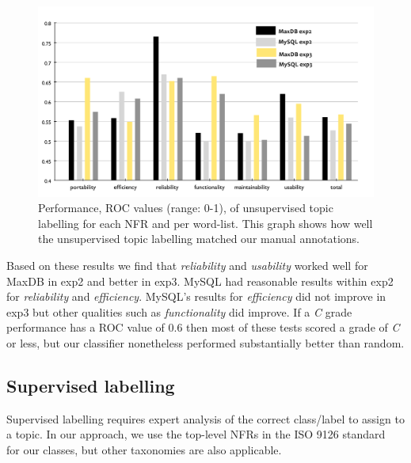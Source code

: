 \documentclass[]{sig-alternate}
\begin{document}
\begin{figure}
  \centering
 \includegraphics[width=\textwidth]{figures/unsupervised-bar}
 \caption{Performance, ROC values (range: 0-1), of unsupervised topic labelling for
   each NFR and per word-list. This graph shows how well the
   unsupervised topic labelling matched our manual annotations.}

  \label{fig:maxdb-unsup-results}
\end{figure}


Based on these results we find that \emph{reliability} and \emph{usability} worked well for MaxDB in \textsf{exp2} and better in \textsf{exp3}. 
MySQL had reasonable results within \textsf{exp2} for \emph{reliability} and \emph{efficiency}. 
MySQL's results for \emph{efficiency} did not improve in \textsf{exp3} but other qualities such as \emph{functionality} did improve. 
If a \emph{C} grade performance has a ROC value of $0.6$ then most of these tests scored a grade of \emph{C} or less, but our classifier nonetheless performed substantially better than random.


\subsection{Supervised labelling}
\label{sec:suplabelling}
Supervised labelling requires expert analysis of the correct class/label to assign to a topic. In our approach, we use the top-level NFRs in the ISO 9126 standard~\cite{iso9126} for our classes, but other taxonomies are also applicable.%
\end{document}

